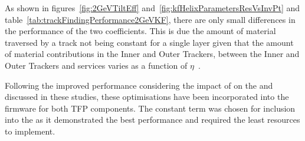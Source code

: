 As shown in figures~\ref{fig:2GeVTiltEff} and~\ref{fig:kfHelixParametersResVsInvPt} and table~\ref{tab:trackFindingPerformance2GeVKF}, there are only small differences in the performance of the two \MS coefficients.
This is due the amount of material traversed by a track not being constant for a single layer given that the amount of material contributions in the Inner and Outer Trackers, between the Inner and Outer Trackers and services varies as a function of $\eta$~\cite{P2TrackerTDR}.

Following the improved performance considering the impact of \MS on the \HT and \KF discussed in these studies, these optimisations have been incorporated into the firmware for both TFP components.
The constant \MS term was chosen for inclusion into the \KF as it demonstrated the best performance and required the least resources to implement.


